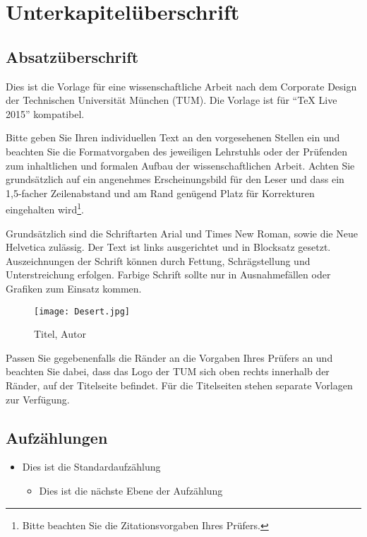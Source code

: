\section{Unterkapitelüberschrift}
\subsection[]{Absatzüberschrift}

Dies ist die Vorlage für eine wissenschaftliche Arbeit nach dem Corporate Design der Technischen Universität München (TUM). Die Vorlage ist für "`TeX Live 2015"' kompatibel.

Bitte geben Sie Ihren individuellen Text an den vorgesehenen Stellen ein und beachten Sie die Formatvorgaben des jeweiligen Lehrstuhls oder der Prüfenden zum inhaltlichen und formalen Aufbau der wissenschaftlichen Arbeit. Achten Sie grundsätzlich auf ein angenehmes Erscheinungsbild für den Leser und dass ein 1,5-facher Zeilenabstand und am Rand genügend Platz für Korrekturen eingehalten wird\footnote{Bitte beachten Sie die Zitationsvorgaben Ihres Prüfers.}.

Grundsätzlich sind die Schriftarten Arial und Times New Roman, sowie die Neue Helvetica zulässig. Der Text ist links ausgerichtet und in Blocksatz gesetzt. Auszeichnungen der Schrift können durch Fettung, Schrägstellung und Unterstreichung erfolgen. Farbige Schrift sollte nur in Ausnahmefällen oder Grafiken zum Einsatz kommen.
\begin{figure}[!ht]
\noindent\hspace{0.5mm}\texttt{[image: Desert.jpg]}
\caption{Titel, Autor}
\end{figure}

Passen Sie gegebenenfalls die Ränder an die Vorgaben Ihres Prüfers an und beachten Sie dabei, dass das Logo der TUM sich oben rechts innerhalb der Ränder, auf der Titelseite befindet. Für die Titelseiten stehen separate
Vorlagen zur Verfügung.



\subsection[]{Aufzählungen}
\begin{itemize}
\item Dies ist die Standardaufzählung
    \begin{itemize}
    \item Dies ist die nächste Ebene der Aufzählung
    \end{itemize}
\end{itemize}


